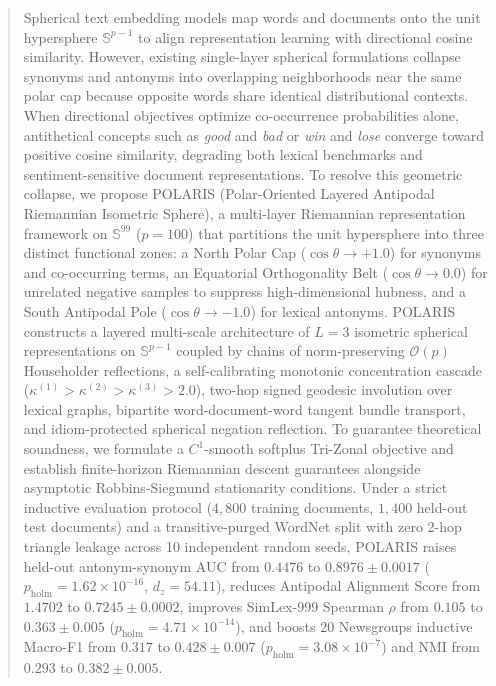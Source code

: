 \documentclass[journal]{IEEEtran}
\begin{document}
\begin{abstract}
Spherical text embedding models map words and documents onto the unit hypersphere $\mathbb{S}^{p-1}$ to align representation learning with directional cosine similarity. However, existing single-layer spherical formulations collapse synonyms and antonyms into overlapping neighborhoods near the same polar cap because opposite words share identical distributional contexts. When directional objectives optimize co-occurrence probabilities alone, antithetical concepts such as \textit{good} and \textit{bad} or \textit{win} and \textit{lose} converge toward positive cosine similarity, degrading both lexical benchmarks and sentiment-sensitive document representations. To resolve this geometric collapse, we propose POLARIS (Polar-Oriented Layered Antipodal Riemannian Isometric Sphere), a multi-layer Riemannian representation framework on $\mathbb{S}^{99}$ ($p=100$) that partitions the unit hypersphere into three distinct functional zones: a North Polar Cap ($\cos\theta\to+1.0$) for synonyms and co-occurring terms, an Equatorial Orthogonality Belt ($\cos\theta\to0.0$) for unrelated negative samples to suppress high-dimensional hubness, and a South Antipodal Pole ($\cos\theta\to-1.0$) for lexical antonyms. POLARIS constructs a layered multi-scale architecture of $L=3$ isometric spherical representations on $\mathbb{S}^{p-1}$ coupled by chains of norm-preserving $\mathcal{O}(p)$ Householder reflections, a self-calibrating monotonic concentration cascade ($\kappa^{(1)}>\kappa^{(2)}>\kappa^{(3)}>2.0$), two-hop signed geodesic involution over lexical graphs, bipartite word-document-word tangent bundle transport, and idiom-protected spherical negation reflection. To guarantee theoretical soundness, we formulate a $C^1$-smooth softplus Tri-Zonal objective and establish finite-horizon Riemannian descent guarantees alongside asymptotic Robbins-Siegmund stationarity conditions. Under a strict inductive evaluation protocol ($4,800$ training documents, $1,400$ held-out test documents) and a transitive-purged WordNet split with zero 2-hop triangle leakage across 10 independent random seeds, POLARIS raises held-out antonym-synonym AUC from $0.4476$ to $\mathbf{0.8976 \pm 0.0017}$ ($p_{\text{holm}} = 1.62 \times 10^{-16}$, $d_z = 54.11$), reduces Antipodal Alignment Score from $1.4702$ to $\mathbf{0.7245 \pm 0.0002}$, improves SimLex-999 Spearman $\rho$ from $0.105$ to $\mathbf{0.363 \pm 0.005}$ ($p_{\text{holm}} = 4.71 \times 10^{-14}$), and boosts 20 Newsgroups inductive Macro-F1 from $0.317$ to $\mathbf{0.428 \pm 0.007}$ ($p_{\text{holm}} = 3.08 \times 10^{-7}$) and NMI from $0.293$ to $\mathbf{0.382 \pm 0.005}$.
\end{abstract}
\end{document}
